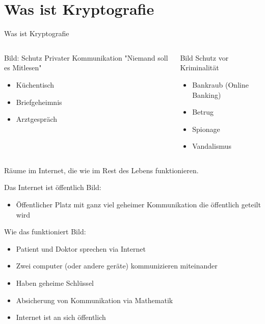 \section{Was ist Kryptografie}


\begin{frame}[T]{Was ist Kryptografie}




\begin{columns}[t,fullwidth]
  \hfill
  \begin{column}{.45\linewidth}
    Bild: Schutz Privater Kommunikation "Niemand soll es Mitlesen"
    \begin{itemize}
      \item Küchentisch
      \item Briefgeheimnis
      \item Arztgespräch
    \end{itemize}
  \end{column}
  \begin{column}{.45\linewidth}
    Bild Schutz vor Kriminalität
    \begin{itemize}
      \item Bankraub (Online Banking)
      \item Betrug
      \item Spionage
      \item Vandalismus
    \end{itemize}
  \end{column}
  \hfill
\end{columns}
Räume im Internet, die wie im Rest des Lebens funktionieren.

\end{frame}

\begin{frame}[T]{Das Internet ist öffentlich}
  Bild: 
  \begin{itemize}
    \item Öffentlicher Platz mit ganz viel geheimer Kommunikation die öffentlich geteilt wird
  \end{itemize}
\end{frame}

\begin{frame}[T]{Wie das funktioniert}
  Bild: 
  \begin{itemize}
    \item Patient und Doktor sprechen via Internet
    \item Zwei computer (oder andere geräte) kommunizieren miteinander
    \item Haben geheime Schlüssel
    \item Absicherung von Kommunikation via Mathematik
    \item Internet ist an sich öffentlich
  \end{itemize}
\end{frame}


